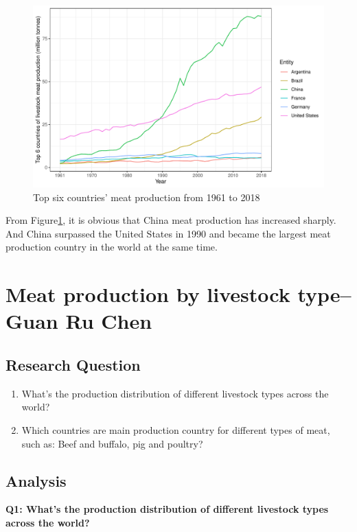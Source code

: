 \documentclass[11pt,a4paper,]{article}
\begin{document}
\begin{figure}
\centering
\includegraphics{report_files/figure-latex/country-1.pdf}
\caption{\label{fig:country}Top six countries' meat production from 1961 to 2018}
\end{figure}

From Figure\ref{fig:country}, it is obvious that China meat production has increased sharply. And China surpassed the United States in 1990 and became the largest meat production country in the world at the same time.

\section*{Meat production by livestock type-- Guan Ru Chen}

\subsection*{Research Question}

\begin{enumerate}
\def\labelenumi{\arabic{enumi}.}
\item
  What's the production distribution of different livestock types across the world?
\item
  Which countries are main production country for different types of meat, such as: Beef and buffalo, pig and poultry?
\end{enumerate}

\subsection*{Analysis}

\textbf{Q1: What's the production distribution of different livestock types across the world?}
\end{document}
